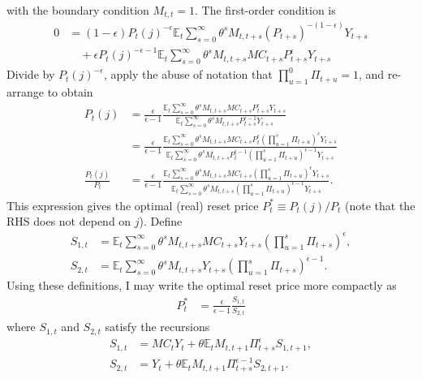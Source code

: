 \documentclass[12 pt, oneside]{article}
\theoremstyle{definition}
\theoremstyle{definition}
\theoremstyle{definition}
\newcommand{\E}{\mathbb{E}}
\begin{document}
with the boundary condition $M_{t, t} = 1$. The first-order condition is
\begin{align*}
0 & =  (1 - \epsilon)P_t(j)^{-\epsilon}\E_t\sum_{s = 0}^\infty \theta^s M_{t, t + s}(P_{t + s})^{-(1 - \epsilon)}Y_{t + s}\\
  &\quad + \epsilon P_t(j)^{-\epsilon - 1}\E_t\sum_{s = 0}^\infty \theta^s M_{t, t + s} MC_{t + s}P_{t + s}^{\epsilon}Y_{t + s}
\end{align*}
Divide by $P_t(j)^{-\epsilon}$, apply the abuse of notation that $\prod_{u = 1}^0 \Pi_{t + u} = 1$, and re-arrange to obtain
\begin{align*}
  P_t(j) & = \frac{\epsilon}{\epsilon - 1}\frac{\E_t\sum_{s = 0}^\infty\theta^s M_{t, t + s} MC_{t + s}P_{t + s}^{\epsilon}Y_{t + s}}{\E_t\sum_{s = 0}^\infty \theta^s M_{t, t + s} P_{t + s}^{\epsilon - 1}Y_{t + s}}\\
         & = \frac{\epsilon}{\epsilon - 1}\frac{\E_t\sum_{s = 0}^\infty \theta^s M_{t, t + s} MC_{t + s}P_t^\epsilon\left(\prod_{u = 1}^s\Pi_{t + u}\right)^{\epsilon}Y_{t + s}}{\E_t\sum_{s = 0}^\infty \theta^s M_{t, t + s}P_t^{\epsilon - 1}\left(\prod_{u = 1}^s\Pi_{t + u}\right)^{\epsilon - 1}Y_{t + s}}\\
  \frac{P_t(j)}{P_t} & = \frac{\epsilon}{\epsilon - 1}\frac{\E_t\sum_{s = 0}^\infty \theta^s M_{t, t + s} MC_{t + s}\left(\prod_{u = 1}^s\Pi_{t + u}\right)^{\epsilon}Y_{t + s}}{\E_t\sum_{s = 0}^\infty \theta^s M_{t, t + s}\left(\prod_{u = 1}^s\Pi_{t + u}\right)^{\epsilon - 1}Y_{t + s}}.
\end{align*}
This expression gives the optimal (real) reset price $P_t^* \equiv P_t(j) / P_t $ (note that the RHS does not depend on $j$).
Define
\begin{align}
  S_{1, t} & = \E_t\sum_{s = 0}^\infty  \theta^s M_{t, t + s} MC_{t + s}Y_{t + s}\left( \prod_{u = 1}^s\Pi_{t + s}\right)^{\epsilon},\\
  S_{2, t}  & = \E_t\sum_{s = 0}^\infty \theta^s M_{t, t + s}Y_{t + s}\left(\prod_{u = 1}^s\Pi_{t + s}\right)^{\epsilon - 1}.
\end{align}
Using these definitions, I may write the optimal reset price more compactly as
\begin{align}
  P_t^* & = \frac{\epsilon}{\epsilon - 1}\frac{S_{1, t}}{S_{2, t}}
\end{align}
where $S_{1, t}$ and $S_{2, t}$ satisfy the recursions
\begin{align}
  S_{1, t} & = MC_t Y_t + \theta \E_t M_{t, t + 1}\Pi_{t + s}^\epsilon S_{1, t + 1},\\
  S_{2, t} & = Y_t + \theta \E_t M_{t, t + 1} \Pi_{t + s}^{\epsilon - 1}S_{2, t + 1}.
\end{align}
\end{document}
